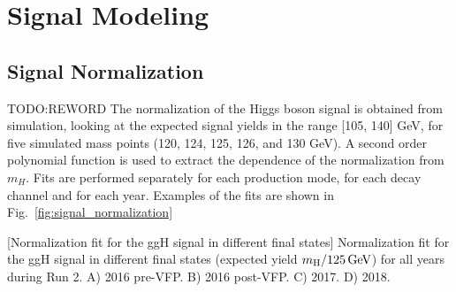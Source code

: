 \section{Signal Modeling}
\label{sec:signal_model}

\subsection{Signal Normalization}
\label{sec:SignalNormalization}
TODO:REWORD The normalization of the Higgs boson signal is obtained from simulation, 
looking at the expected signal yields in the range [105, 140] GeV, 
for five simulated mass points (120, 124, 125, 126, and 130 GeV).
A second order polynomial function is used to extract the dependence of the normalization from $m_{H}$.
Fits are performed separately for each production mode, for each decay channel and for each year. 
Examples of the fits are shown in Fig.~\ref{fig:signal_normalization}
\begin{multiFigure}
    \centering
        [Normalization fit for the ggH signal in different final states]
        {Normalization fit for the ggH signal in different final states (expected yield \vs $m_{\mathrm{H}} / 125\,\text{Ge\hspace{-.08em}V}$) for all years during Run 2.
        \;A) 2016 pre-VFP.
        \;B) 2016 post-VFP.
        \;C) 2017.
        \;D) 2018.
        }
    \label{fig:signal_normalization}
\end{multiFigure}
